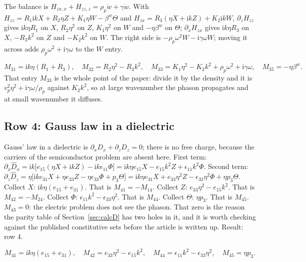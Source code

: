 \documentclass[11pt]{article}
\makeatletter
\newif\ifshowworked
\newenvironment{worked}{%
  \ifshowworked\par\smallskip\noindent\textit{Working.}\par\smallskip\else
  \setbox\z@\vbox\bgroup\fi}{\ifshowworked\par\smallskip\else\egroup\fi}
\newcommand{\ii}{\mathrm{i}}
\makeatother
\begin{document}
\begin{worked}
The balance is $H_{zx,x}+H_{zz,z}=\rho_p\ddot w+\gamma\dot w$. With
$H_{zz}=R_1\ii kX+R_2\eta Z+K_1\eta W-\beta^{w}\Theta$ and
$H_{zx}=R_3(\eta X+\ii kZ)+K_2\ii kW$,
$\partial_zH_{zz}$ gives $\ii k\eta R_1$ on $X$, $R_2\eta^2$ on $Z$, $K_1\eta^2$ on $W$ and
$-\eta\beta^{w}$ on $\Theta$;
$\partial_xH_{zx}$ gives $\ii k\eta R_3$ on $X$, $-R_3k^2$ on $Z$ and $-K_2k^2$ on $W$.
The right side is $-\rho_p\omega^2W-\ii\gamma\omega W$; moving it across adds $\rho_p\omega^2+\ii\gamma\omega$
to the $W$ entry.
\end{worked}

\begin{equation}
M_{31}=\ii k\eta(R_1+R_3),\quad
M_{32}=R_2\eta^2-R_3k^2,\quad
M_{33}=K_1\eta^2-K_2k^2+\rho_p\omega^2+\ii\gamma\omega,\quad
M_{35}=-\eta\beta^{w}.
\end{equation}
That entry $M_{33}$ is the whole point of the paper: divide it by the density and it is
$v_p^2\eta^2+\ii\gamma\omega/\rho_p$ against $K_2k^2$, so at large wavenumber the phason propagates and at
small wavenumber it diffuses.

\subsection*{Row 4: Gauss law in a dielectric}

\begin{worked}
Gauss' law in a dielectric is $\partial_xD_x+\partial_zD_z=0$; there is no free charge, because the
carriers of the semiconductor problem are absent here.
First term: $\partial_x\hat D_x=\ii k\bigl[e_{15}(\eta X+\ii kZ)-\ii k\epsilon_{11}\Phi\bigr]
=\ii k\eta e_{15}X-e_{15}k^2Z+\epsilon_{11}k^2\Phi$.
Second term: $\partial_z\hat D_z=\eta\bigl[\ii ke_{31}X+\eta e_{33}Z-\eta\epsilon_{33}\Phi+p_3\Theta\bigr]
=\ii k\eta e_{31}X+e_{33}\eta^2Z-\epsilon_{33}\eta^2\Phi+\eta p_3\Theta$.
Collect $X$: $\ii k\eta(e_{15}+e_{31})$. That is $M_{41}=-M_{14}$.
Collect $Z$: $e_{33}\eta^2-e_{15}k^2$. That is $M_{42}=-M_{24}$.
Collect $\Phi$: $\epsilon_{11}k^2-\epsilon_{33}\eta^2$. That is $M_{44}$.
Collect $\Theta$: $\eta p_3$. That is $M_{45}$.
$M_{43}=0$: the electric problem does not see the phason. That zero is the reason the parity table of
Section~\ref{sec:calcD} has two holes in it, and it is worth checking against the published constitutive
sets before the article is written up.
Result: row 4.
\end{worked}

\begin{equation}
M_{41}=\ii k\eta(e_{15}+e_{31}),\quad
M_{42}=e_{33}\eta^2-e_{15}k^2,\quad
M_{44}=\epsilon_{11}k^2-\epsilon_{33}\eta^2,\quad
M_{45}=\eta p_3 .
\end{equation}
\end{document}
